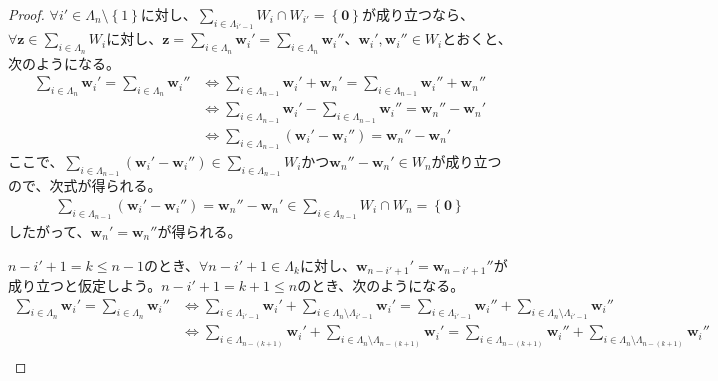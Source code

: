 \documentclass[dvipdfmx]{jsarticle}
\begin{document}
\begin{proof}
$\forall i' \in \varLambda_{n} \setminus \left\{ 1 \right\}$に対し、$\sum_{i \in \varLambda_{i' - 1}} W_{i} \cap W_{i'} = \left\{ \mathbf{0} \right\}$が成り立つなら、$\forall\mathbf{z} \in \sum_{i \in \varLambda_{n}} W_{i}$に対し、$\mathbf{z} = \sum_{i \in \varLambda_{n}} \mathbf{w}_{i}' = \sum_{i \in \varLambda_{n}} \mathbf{w}_{i}''$、$\mathbf{w}_{i}',\mathbf{w}_{i}'' \in W_{i}$とおくと、次のようになる。
\begin{align*}
\sum_{i \in \varLambda_{n}} \mathbf{w}_{i}' = \sum_{i \in \varLambda_{n}} \mathbf{w}_{i}'' &\Leftrightarrow \sum_{i \in \varLambda_{n - 1}} \mathbf{w}_{i}' + \mathbf{w}_{n}' = \sum_{i \in \varLambda_{n - 1}} \mathbf{w}_{i}'' + \mathbf{w}_{n}''\\
&\Leftrightarrow \sum_{i \in \varLambda_{n - 1}} \mathbf{w}_{i}' - \sum_{i \in \varLambda_{n - 1}} \mathbf{w}_{i}'' = \mathbf{w}_{n}'' - \mathbf{w}_{n}'\\
&\Leftrightarrow \sum_{i \in \varLambda_{n - 1}} \left( \mathbf{w}_{i}' - \mathbf{w}_{i}'' \right) = \mathbf{w}_{n}'' - \mathbf{w}_{n}'
\end{align*}
ここで、$\sum_{i \in \varLambda_{n - 1}} \left( \mathbf{w}_{i}' - \mathbf{w}_{i}'' \right) \in \sum_{i \in \varLambda_{n - 1}} W_{i}$かつ$\mathbf{w}_{n}'' - \mathbf{w}_{n}' \in W_{n}$が成り立つので、次式が得られる。
\begin{align*}
\sum_{i \in \varLambda_{n - 1}} \left( \mathbf{w}_{i}' - \mathbf{w}_{i}'' \right) = \mathbf{w}_{n}'' - \mathbf{w}_{n}' \in \sum_{i \in \varLambda_{n - 1}} W_{i} \cap W_{n} = \left\{ \mathbf{0} \right\}
\end{align*}
したがって、$\mathbf{w}_{n}' = \mathbf{w}_{n}''$が得られる。\par
$n - i' + 1 = k \leq n - 1$のとき、$\forall n - i' + 1 \in \varLambda_{k}$に対し、$\mathbf{w}_{n - i' + 1}' = \mathbf{w}_{n - i' + 1}''$が成り立つと仮定しよう。$n - i' + 1 = k + 1 \leq n$のとき、次のようになる。
\begin{align*}
\sum_{i \in \varLambda_{n}} \mathbf{w}_{i}' = \sum_{i \in \varLambda_{n}} \mathbf{w}_{i}'' &\Leftrightarrow \sum_{i \in \varLambda_{i' - 1}} \mathbf{w}_{i}' + \sum_{i \in \varLambda_{n} \setminus \varLambda_{i' - 1}} \mathbf{w}_{i}' = \sum_{i \in \varLambda_{i' - 1}} \mathbf{w}_{i}'' + \sum_{i \in \varLambda_{n} \setminus \varLambda_{i' - 1}} \mathbf{w}_{i}''\\
&\Leftrightarrow \sum_{i \in \varLambda_{n - (k + 1)}} \mathbf{w}_{i}' + \sum_{i \in \varLambda_{n} \setminus \varLambda_{n - (k + 1)}} \mathbf{w}_{i}' = \sum_{i \in \varLambda_{n - (k + 1)}} \mathbf{w}_{i}'' + \sum_{i \in \varLambda_{n} \setminus \varLambda_{n - (k + 1)}} \mathbf{w}_{i}''\\

\end{align*}
\end{proof}
\end{document}
